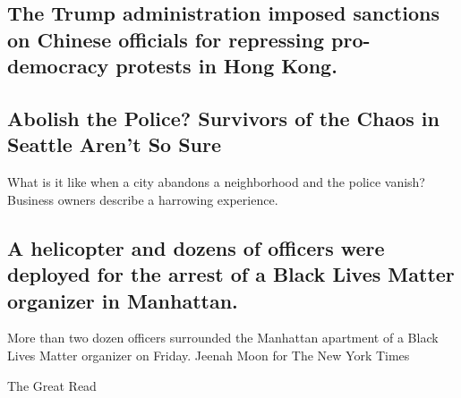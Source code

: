 \href{/2020/08/07/world/asia/trump-china-hong-kong-sanctions.html}{}

\hypertarget{the-trump-administration-imposed-sanctions-on-chinese-officials-for-repressing-pro-democracy-protests-in-hong-kong}{%
\subsection{The Trump administration imposed sanctions on Chinese
officials for repressing pro-democracy protests in Hong
Kong.}\label{the-trump-administration-imposed-sanctions-on-chinese-officials-for-repressing-pro-democracy-protests-in-hong-kong}}

\href{/2020/08/07/us/defund-police-seattle-protests.html}{}

\hypertarget{abolish-the-police-survivors-of-the-chaos-in-seattle-arent-so-sure}{%
\subsection{Abolish the Police? Survivors of the Chaos in Seattle Aren't
So
Sure}\label{abolish-the-police-survivors-of-the-chaos-in-seattle-arent-so-sure}}

What is it like when a city abandons a neighborhood and the police
vanish? Business owners describe a harrowing experience.

\href{/2020/08/07/nyregion/nypd-derrick-ingram-protester.html}{}

\hypertarget{a-helicopter-and-dozens-of-officers-were-deployed-for-the-arrest-of-a-black-lives-matter-organizer-in-manhattan}{%
\subsection{A helicopter and dozens of officers were deployed for the
arrest of a Black Lives Matter organizer in
Manhattan.}\label{a-helicopter-and-dozens-of-officers-were-deployed-for-the-arrest-of-a-black-lives-matter-organizer-in-manhattan}}

\href{/2020/08/07/nyregion/nypd-derrick-ingram-protester.html}{}

More than two dozen officers surrounded the Manhattan apartment of a
Black Lives Matter organizer on Friday. Jeenah Moon for The New York
Times

\href{/2020/08/07/nyregion/nypd-derrick-ingram-protester.html}{}

\href{/2020/08/07/us/farmer-influencer-youtube.html}{}

The Great Read

